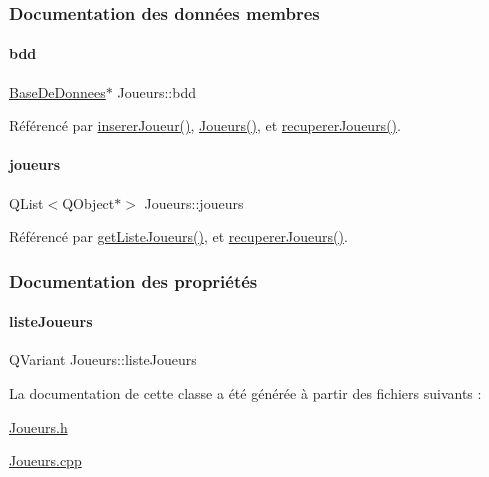 \subsubsection{Documentation des données membres}
\mbox{\label{class_joueurs_ac060c3017311b67a97ed488ce2bb2332}} 
\paragraph{\texorpdfstring{bdd}{bdd}}
{\footnotesize\ttfamily \hyperlink{class_base_de_donnees}{Base\+De\+Donnees}$\ast$ Joueurs\+::bdd\hspace{0.3cm}{\ttfamily [private]}}



Référencé par \hyperlink{class_joueurs_ad41325dbd0611773c6e9fd8a814be1b3}{inserer\+Joueur()}, \hyperlink{class_joueurs_ac0f9bfbacdcda2622d7438d0445200e8}{Joueurs()}, et \hyperlink{class_joueurs_a5bd70438c6624d8dca765e322285eb61}{recuperer\+Joueurs()}.

\mbox{\label{class_joueurs_a86c2a21b5a6b83f9a43f9a957a020fd7}} 
\paragraph{\texorpdfstring{joueurs}{joueurs}}
{\footnotesize\ttfamily Q\+List$<$Q\+Object$\ast$$>$ Joueurs\+::joueurs\hspace{0.3cm}{\ttfamily [private]}}



Référencé par \hyperlink{class_joueurs_aec63d4e2fe1bf7fbf33489c1a8d3bbbf}{get\+Liste\+Joueurs()}, et \hyperlink{class_joueurs_a5bd70438c6624d8dca765e322285eb61}{recuperer\+Joueurs()}.



\subsubsection{Documentation des propriétés}
\mbox{\label{class_joueurs_a809d64435e34f4f7f0218d4616b727c0}} 
\paragraph{\texorpdfstring{liste\+Joueurs}{listeJoueurs}}
{\footnotesize\ttfamily Q\+Variant Joueurs\+::liste\+Joueurs\hspace{0.3cm}{\ttfamily [read]}}



La documentation de cette classe a été générée à partir des fichiers suivants \+:\begin{DoxyCompactItemize}
\item 
\hyperlink{_joueurs_8h}{Joueurs.\+h}\item 
\hyperlink{_joueurs_8cpp}{Joueurs.\+cpp}\end{DoxyCompactItemize}
